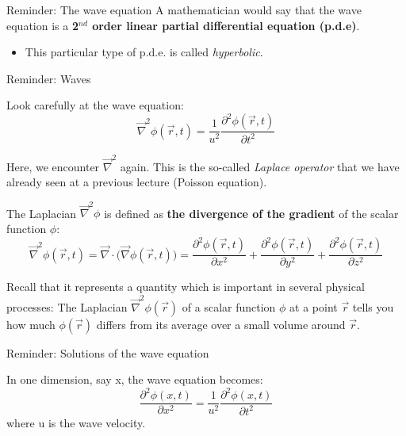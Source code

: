 {\begin{frame}{Reminder: The wave equation}
A mathematician would say that the wave equation is a
{\bf 2$^{nd}$ order linear partial differential equation (p.d.e)}.
\begin{itemize}
   \item This particular type of p.d.e. is called {\em hyperbolic}.
\end{itemize}

\end{frame}

%
%
%
%

\begin{frame}{Reminder: Waves}

Look carefully at the wave equation:
\begin{equation*}
   \vec{\nabla}^{2} \phi(\vec{r}, t) = \frac{1}{u^2} \frac{\partial^{2} \phi(\vec{r}, t)} {\partial t^{2}}
\end{equation*}

Here, we encounter $\vec{\nabla}^{2}$ again.
This is the so-called {\em Laplace operator} that we have already seen at a previous lecture (Poisson equation).\\

\vspace{0.2cm}

The Laplacian $\vec{\nabla}^{2} \phi$ is defined as
{\bf the divergence of the gradient} of the scalar function $\phi$:
\begin{equation*}
   \vec{\nabla}^{2} \phi(\vec{r}, t) =
   \vec{\nabla} \cdot \Big( \vec{\nabla} \phi(\vec{r}, t) \Big) =
   \frac{\partial^{2} \phi(\vec{r}, t)} {\partial x^{2}} +
   \frac{\partial^{2} \phi(\vec{r}, t)} {\partial y^{2}} +
   \frac{\partial^{2} \phi(\vec{r}, t)} {\partial z^{2}}
\end{equation*}

Recall that it represents a quantity which is important in several physical processes:
The Laplacian $\vec{\nabla}^{2} \phi(\vec{r})$ of a scalar function $\phi$ at a point $\vec{r}$
tells you how much $\phi(\vec{r})$ differs from its average over a small volume around $\vec{r}$.

\end{frame}


%
%
%
%

\begin{frame}{Reminder: Solutions of the wave equation}

In one dimension, say x, the wave equation becomes:
\begin{equation*}
    \frac{\partial^{2} \phi(x, t)} {\partial x^{2}} =
    \frac{1}{u^2} \frac{\partial^{2} \phi(x, t)} {\partial t^{2}}
\end{equation*}
where u is the wave velocity.\\


\end{frame}}
